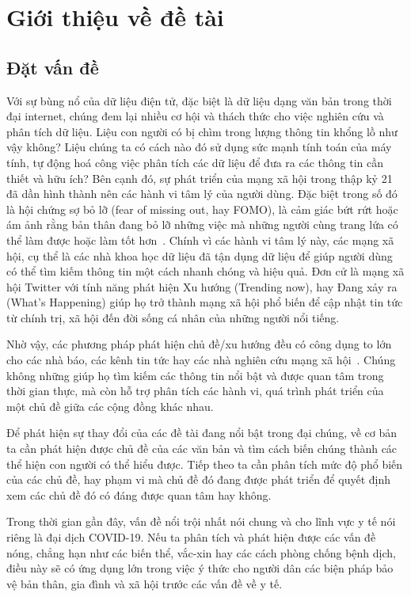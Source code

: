 \chapter{Giới thiệu về đề tài}
\label{sec:introduction}

\section{Đặt vấn đề}
Với sự bùng nổ của dữ liệu điện tử, đặc biệt là dữ liệu dạng văn bản trong thời đại internet, chúng đem lại nhiều cơ hội và thách thức cho việc nghiên cứu và phân tích dữ liệu. Liệu con người có bị chìm trong lượng thông tin khổng lồ như vậy không? Liệu chúng ta có cách nào đó sử dụng sức mạnh tính toán của máy tính, tự động hoá công việc phân tích các dữ liệu để đưa ra các thông tin cần thiết và hữu ích? Bên cạnh đó, sự phát triển của mạng xã hội trong thập kỷ 21 đã dần hình thành nên các hành vi tâm lý của người dùng. Đặc biệt trong số đó là hội chứng sợ bỏ lỡ (fear of missing out, hay FOMO), là cảm giác bứt rứt hoặc ám ảnh rằng bản thân đang bỏ lỡ những việc mà những người cùng trang lứa có thể làm được hoặc làm tốt hơn~\cite{jwtintelligenceFearMissingOut2015}. Chính vì các hành vi tâm lý này, các mạng xã hội, cụ thể là các nhà khoa học dữ liệu đã tận dụng dữ liệu để giúp người dùng có thể tìm kiếm thông tin một cách nhanh chóng và hiệu quả.  Đơn cử là mạng xã hội Twitter với tính năng phát hiện Xu hướng (Trending now), hay Đang xảy ra (What's Happening) giúp họ trở thành mạng xã hội phổ biến để cập nhật tin tức từ chính trị, xã hội đến đời sống cá nhân của những người nổi tiếng.

Nhờ vậy, các phương pháp phát hiện chủ đề/xu hướng đều có công dụng to lớn cho các nhà báo, các kênh tin tức hay các nhà nghiên cứu mạng xã hội~\cite{madaniRealtimeTrendingTopics2015}. Chúng không những giúp họ tìm kiếm các thông tin nổi bật và được quan tâm trong thời gian thực, mà còn hỗ trợ phân tích các hành vi, quá trình phát triển của một chủ đề giữa các cộng đồng khác nhau.

Để phát hiện sự thay đổi của các đề tài đang nổi bật trong đại chúng, về cơ bản ta cần phát hiện được chủ đề của các văn bản và tìm cách biến chúng thành các thể hiện con người có thể hiểu được. Tiếp theo ta cần phân tích mức độ phổ biến của các chủ đề, hay phạm vi mà chủ đề đó đang được phát triển để quyết định xem các chủ đề đó có đáng được quan tâm hay không.

Trong thời gian gần đây, vấn đề nổi trội nhất nói chung và cho lĩnh vực y tế nói riêng là đại dịch COVID-19. Nếu ta phân tích và phát hiện được các vấn đề nóng, chẳng hạn như các biến thể, vắc-xin hay các cách phòng chống bệnh dịch, điều này sẽ có ứng dụng lớn trong việc ý thức cho người dân các biện pháp bảo vệ bản thân, gia đình và xã hội trước các vấn đề về y tế.

